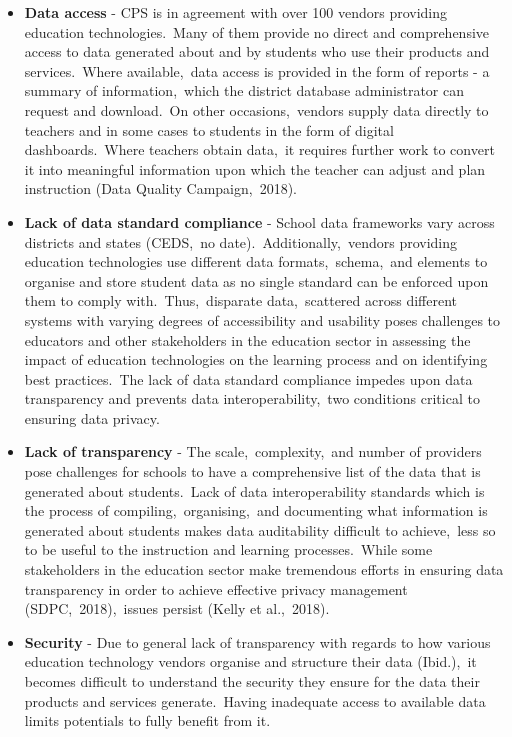 \documentclass{article}
\begin{document}
\begin{itemize}
  \item \textbf{Data access} - CPS is in agreement with over 100 vendors providing education technologies.\ Many of them provide no direct and comprehensive access to data generated about and by students who use their products and services.\ Where available,\ data access is  provided in the form of reports - a summary of information,\ which the district database administrator can request and download.\ On other occasions,\ vendors supply data directly to teachers and in some cases to students in the form of digital dashboards.\ Where teachers obtain data,\ it requires further work to convert it into meaningful information upon which the teacher can adjust and plan instruction (Data Quality Campaign,\ 2018).\ 
  
  \item \textbf{Lack of data standard compliance} - School data frameworks vary across districts and states (CEDS,\ no date).\ Additionally,\ vendors providing education technologies use different data formats,\ schema,\ and elements to organise and store student data as no single standard can be enforced upon them to comply with.\ Thus,\ disparate data,\ scattered across different systems with varying degrees of accessibility and usability poses challenges to educators and other stakeholders in the education sector in assessing the impact of education technologies on the learning process and on identifying best practices.\ The lack of data standard compliance impedes upon data transparency and prevents data interoperability,\ two conditions critical to ensuring data privacy.\ 
  
  \item \textbf{Lack of transparency} - The scale,\ complexity,\ and number of providers pose challenges for schools to have a comprehensive list of the data that is generated about students.\ Lack of data interoperability standards which is the process of compiling,\ organising,\ and documenting what information is generated about students makes data auditability difficult to achieve,\ less so to be useful to the instruction and learning processes.\ While some stakeholders in the education sector make tremendous efforts in ensuring data transparency in order to achieve effective privacy management (SDPC,\ 2018),\ issues persist (Kelly et al.,\ 2018).
  
  \item \textbf{Security} - Due to general lack of transparency with regards to how various education technology vendors organise and structure their data (Ibid.),\ it becomes difficult to understand the security they ensure for the data their products and services generate.\ Having inadequate access to available data limits potentials to fully benefit from it.
  
\end{itemize}
\end{document}
